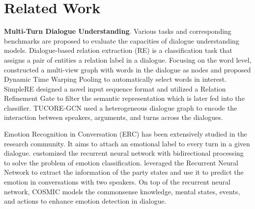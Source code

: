 \section{Related Work}\label{related_work}
\textbf{Multi-Turn Dialogue Understanding}. Various tasks and corresponding benchmarks are proposed to evaluate the capacities of dialogue understanding models. Dialogue-based relation extraction (RE) is a classification task that assigns a pair of entities a relation label in a dialogue. Focusing on the word level,  \cite{xue2021gdpnet} constructed a multi-view graph with words in the dialogue as nodes and proposed Dynamic Time Warping Pooling to automatically select words in interest. SimpleRE \citep{SimpleRE} designed a novel input sequence format and utilized a Relation Refinement Gate to filter the semantic representation which is later fed into the classifier. TUCORE-GCN \citep{zahiri:18a} used a heterogeneous dialogue graph to encode the interaction between speakers, arguments, and turns across the dialogues.

Emotion Recognition in Conversation (ERC) has been extensively studied in the research community. It aims to attach an emotional label to every turn in a given dialogue. \cite{kratzwald2018deep} customized the recurrent neural network with bidirectional processing to solve the problem of emotion classification. \cite{majumder2019dialoguernn} leveraged the Recurrent Neural Network to extract the information of the party states and use it to predict the emotion in conversations with two speakers. On top of the recurrent neural network, COSMIC \cite{ghosal2020cosmic} models the commonsense knowledge, mental states, events, and actions to enhance emotion detection in dialogue. 

